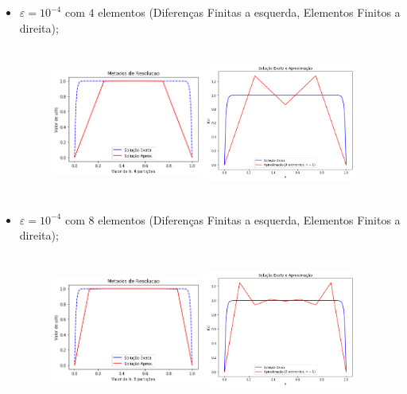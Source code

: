 \documentclass{article}
\begin{document}
\begin{itemize}
\newpage

\item $\varepsilon = 10^{-4}$ com $4$ elementos (Diferenças Finitas a esquerda, Elementos Finitos a direita);

\begin{figure}[!htb]
\centering
\includegraphics [width=5cm,height=5cm]{LetraD/4el_e10-4.png}
\includegraphics [width=5cm,height=5cm]{LetraD/4el_n1_e10-4.png}
\end{figure}

\item $\varepsilon = 10^{-4}$ com $8$ elementos (Diferenças Finitas a esquerda, Elementos Finitos a direita);

\begin{figure}[!htb]
\centering
\includegraphics [width=5cm,height=5cm]{LetraD/8el_e10-4.png}
\includegraphics [width=5cm,height=5cm]{LetraD/8el_n1_e10-4.png}
\end{figure}


\end{itemize}
\end{document}
